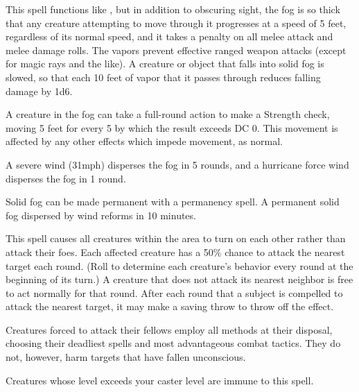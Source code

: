 \spelldur{\durmed}
\begin{spelleffect}
  This spell functions like , but in addition to obscuring sight, the fog is so thick that any creature attempting to move through it progresses at a speed of 5 feet, regardless of its normal speed, and it takes a  penalty on all melee attack and melee damage rolls. The vapors prevent effective ranged weapon attacks (except for magic rays and the like). A creature or object that falls into solid fog is slowed, so that each 10 feet of vapor that it passes through reduces falling damage by 1d6.
  \par A creature in the fog can take a full-round action to make a Strength check, moving 5 feet for every 5 by which the result exceeds DC 0. This movement is affected by any other effects which impede movement, as normal.
\end{spelleffect}
\begin{spellnotes}
  A severe wind (31\add mph) disperses the fog in 5 rounds, and a hurricane force wind disperses the fog in 1 round.
  \par Solid fog can be made permanent with a permanency spell. A permanent solid fog dispersed by wind reforms in 10 minutes.
\end{spellnotes}

\spelldur{\durshort}
\begin{spelleffect}
  This spell causes all creatures within the area to turn on each other rather than attack their foes. Each affected creature has a 50\% chance to attack the nearest target each round. (Roll to determine each creature's behavior every round at the beginning of its turn.) A creature that does not attack its nearest neighbor is free to act normally for that round. After each round that a subject is compelled to attack the nearest target, it may make a saving throw to throw off the effect.
  \par Creatures forced to attack their fellows employ all methods at their disposal, choosing their deadliest spells and most advantageous combat tactics. They do not, however, harm targets that have fallen unconscious.
\end{spelleffect}
\begin{spellnotes}
    Creatures whose level exceeds your caster level are immune to this spell.
\end{spellnotes}

